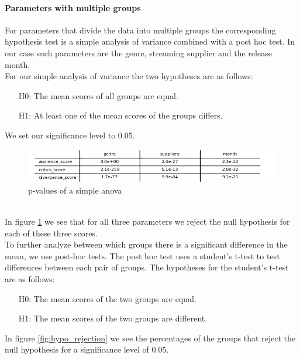 \documentclass{article}
\begin{document}
    \paragraph{Parameters with multiple groups}
    For parameters that divide the data into multiple groups the corresponding hypothesis test is a simple analysis of variance combined with a post hoc test. In our case such parameters are the genre, streaming supplier and the release month.\\
    For our simple analysis of variance the two hypotheses are as follows:
    \begin{enumerate}
        \item[H0:] The mean scores of all groups are equal.
        \item[H1:] At least one of the mean scores of the groups differs.
    \end{enumerate}
    We set our significance level to 0.05.\\
    \noindent
    \begin{figure}[h!]
        \centering
        \includegraphics[width=1\textwidth]{imgs/var_p.png}
        \caption{p-values of a simple anova}
        \label{fig:variance_p}
    \end{figure}\\
    In figure \ref{fig:variance_p} we see that for all three parameters we reject the null hypothesis for each of these three scores.\\
    To further analyze between which groups there is a significant difference in the mean, we use post-hoc tests. The post hoc test uses a student's t-test to test differences between each pair of groups. The hypotheses for the student's t-test are as follows:
    \begin{enumerate}
        \item[H0:] The mean scores of the two groups are equal.
        \item[H1:] The mean scores of the two groups are different.
    \end{enumerate}
    In figure \ref{fig:hypo_rejection} we see the percentages of the groups that reject the null hypothesis for a significance level of 0.05.
\end{document}
